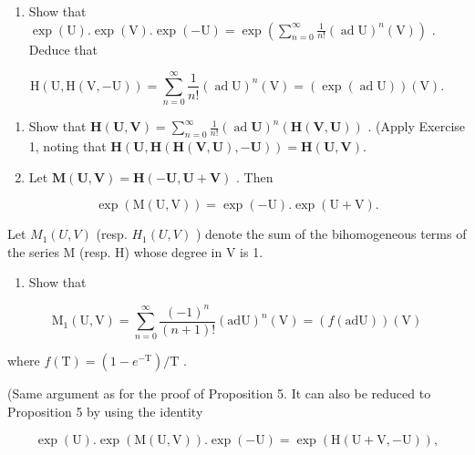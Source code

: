 
\begin{enumerate}
\def\labelenumi{\arabic{enumi}.}
\tightlist
\item
  Show that \(\exp (\mathrm{U}).\exp (\mathrm{V}).\exp (-\mathrm{U}) = \exp \left(\sum_{n = 0}^{\infty}\frac{1}{n!} (\operatorname {ad}\mathrm{U})^{n}(\mathrm{V})\right)\) . Deduce that
\end{enumerate}

\[
\mathrm{H} (\mathrm{U}, \mathrm{H} (\mathrm{V}, - \mathrm{U})) = \sum_ {n = 0} ^ {\infty} \frac {1}{n !} (\operatorname{ad} \mathrm{U}) ^ {n} (\mathrm{V}) = (\exp (\operatorname{ad} \mathrm{U})) (\mathrm{V}).
\]

\begin{enumerate}
\def\labelenumi{\arabic{enumi}.}
\setcounter{enumi}{1}
\item
  Show that \(\mathbf{H}(\mathbf{U},\mathbf{V}) = \sum_{n = 0}^{\infty}\frac{1}{n!} (\operatorname {ad}\mathbf{U})^{n}(\mathbf{H}(\mathbf{V},\mathbf{U}))\) . (Apply Exercise 1, noting that \(\mathbf{H}(\mathbf{U},\mathbf{H}(\mathbf{H}(\mathbf{V},\mathbf{U}), - \mathbf{U})) = \mathbf{H}(\mathbf{U},\mathbf{V}).\)
\item
  Let \(\mathbf{M}(\mathbf{U},\mathbf{V}) = \mathbf{H}(-\mathbf{U},\mathbf{U} + \mathbf{V})\) . Then
\end{enumerate}

\[
\exp (\mathrm{M} (\mathrm{U}, \mathrm{V})) = \exp (- \mathrm{U}). \exp (\mathrm{U} + \mathrm{V}).
\]

Let \(M_{1}(U, V)\) (resp. \(H_{1}(U, V)\) ) denote the sum of the bihomogeneous terms of the series M (resp. H) whose degree in V is 1.

\begin{enumerate}
\def\labelenumi{(\alph{enumi})}
\tightlist
\item
  Show that
\end{enumerate}

\[
\mathrm{M} _ {1} (\mathrm{U}, \mathrm{V}) = \sum_ {n = 0} ^ {\infty} \frac {(- 1) ^ {n}}{(n + 1) !} (\mathrm{adU}) ^ {n} (\mathrm{V}) = (f (\mathrm{adU})) (\mathrm{V})
\]

where \(f(\mathrm{T}) = (1 - e^{-\mathrm{T}}) / \mathrm{T}\) .

(Same argument as for the proof of Proposition 5. It can also be reduced to Proposition 5 by using the identity

\[
\exp (\mathrm{U}). \exp (\mathrm{M} (\mathrm{U}, \mathrm{V})). \exp (- \mathrm{U}) = \exp (\mathrm{H} (\mathrm{U} + \mathrm{V}, - \mathrm{U})),
\]

